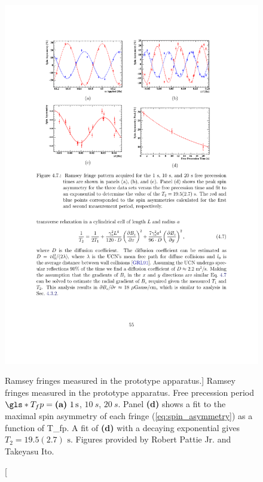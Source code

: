 \begin{figure}[hbp]
    \centering
    \includegraphics[width=\textwidth]{figures/2017_ramsey_fringes.pdf}
    \caption
    [Ramsey fringes measured in the prototype apparatus.]
    {Ramsey fringes measured in the prototype apparatus. Free precession period $\gls*{T_fp}=\text{\textbf{(a)} }\qty{1}{s}$, $\qty{10}{s}$, $\qty{20}{s}$. Panel \textbf{(d)} shows a fit to the maximal spin asymmetry of each fringe (\ref{eq:spin_asymmetry}) as a function of \gls*{T_fp}. A fit of \textbf{(d)} with a decaying exponential gives $T_2=19.5(2.7)\text{ s}$. Figures provided by Robert Pattie Jr. and Takeyasu Ito.}
    \label{fig:ramsey_fringes_2017}
\end{figure}